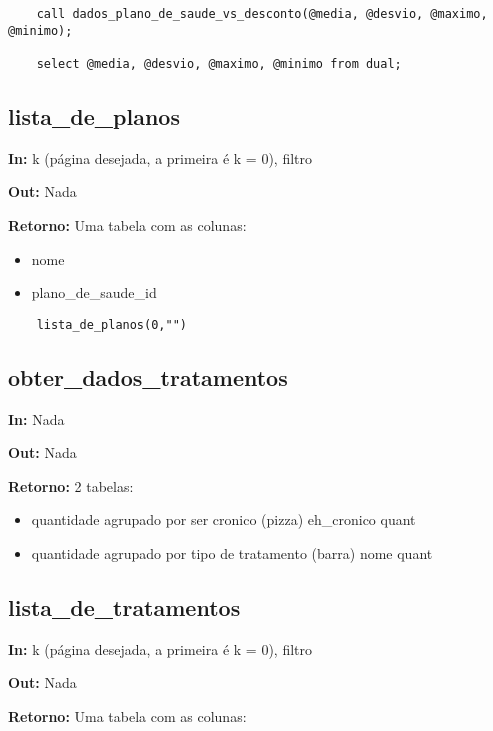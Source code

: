\begin{verbatim}
	call dados_plano_de_saude_vs_desconto(@media, @desvio, @maximo, @minimo);
	
	select @media, @desvio, @maximo, @minimo from dual;
\end{verbatim}

\subsection{lista\_de\_planos}

\textbf{In:} k (página desejada, a primeira é k = 0), filtro

\textbf{Out:} Nada

\textbf{Retorno:} Uma tabela com as colunas:

\begin{itemize}
	\item nome
	\item plano\_de\_saude\_id
\end{itemize}

\begin{verbatim}
	lista_de_planos(0,"")
\end{verbatim}

\subsection{obter\_dados\_tratamentos}

\textbf{In:} Nada

\textbf{Out:} Nada

\textbf{Retorno:} 2 tabelas:

\begin{itemize}
	\item quantidade agrupado por ser cronico (pizza)
	\subitem eh\_cronico
	\subitem quant
	
	\item quantidade agrupado por tipo de tratamento (barra)
	\subitem nome
	\subitem quant
\end{itemize}

\subsection{lista\_de\_tratamentos}

\textbf{In:} k (página desejada, a primeira é k = 0), filtro

\textbf{Out:} Nada

\textbf{Retorno:} Uma tabela com as colunas:

